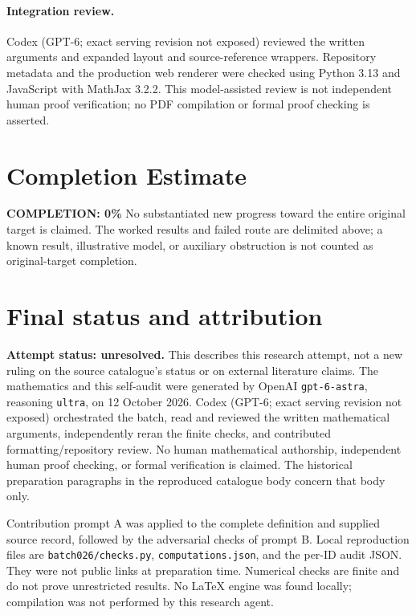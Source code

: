 \documentclass[11pt]{article}
\begin{document}
\paragraph{Integration review.} Codex (GPT-6; exact serving revision not exposed) reviewed the written arguments and expanded layout and source-reference wrappers. Repository metadata and the production web renderer were checked using Python 3.13 and JavaScript with MathJax 3.2.2. This model-assisted review is not independent human proof verification; no PDF compilation or formal proof checking is asserted.

\section{Completion Estimate}
\noindent\textbf{COMPLETION: 0\%}
No substantiated new progress toward the entire original target is claimed. The worked results and failed route are delimited above; a known result, illustrative model, or auxiliary obstruction is not counted as original-target completion.

\section{Final status and attribution}
\textbf{Attempt status: unresolved.} This describes this research attempt, not a new ruling on the source catalogue's status or on external literature claims.
The mathematics and this self-audit were generated by OpenAI \texttt{gpt-6-astra}, reasoning \texttt{ultra}, on 12 October 2026. Codex (GPT-6; exact serving revision not exposed) orchestrated the batch, read and reviewed the written mathematical arguments, independently reran the finite checks, and contributed formatting/repository review. No human mathematical authorship, independent human proof checking, or formal verification is claimed. The historical preparation paragraphs in the reproduced catalogue body concern that body only.

Contribution prompt A was applied to the complete definition and supplied source record, followed by the adversarial checks of prompt B. Local reproduction files are \texttt{batch026/checks.py}, \texttt{computations.json}, and the per-ID audit JSON. They were not public links at preparation time. Numerical checks are finite and do not prove unrestricted results. No LaTeX engine was found locally; compilation was not performed by this research agent.
\end{document}
